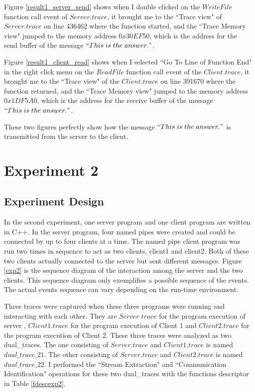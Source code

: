 Figure \ref{result1_server_send} shows when I double clicked on the $WriteFile$ function call event of $Server.trace$, it brought me to the ``Trace view" of $Server.trace$ on line 436462 where the function started, and the ``Trace Memory view" jumped to the memory address $0x30EF50$, which is the address for the send buffer of the message $``This\; is\; the\; answer."$.

Figure \ref{result1_client_read} shows when I selected ``Go To Line of Function End" in the right click menu on the $ReadFile$ function call event of the $Client.trace$, it brought me to the ``Trace view" of the $Client.trace$ on line 391670 where the function returned, and the ``Trace Memory view" jumped to the memory address $0x1DF5A0$, which is the address for the receive buffer of the message $``This\; is\; the\; answer."$.

These two figures perfectly show how the message $``This\; is\; the\; answer."$ is transmitted from the server to the client.

\section{Experiment 2}
\subsection{Experiment Design}
In the second experiment, one server program and one client program are written in C++. In the server program, four named pipes were created and could be connected by up to four clients at a time. The named pipe client program was run two times in sequence to act as two clients, client1 and client2. Both of these two clients actually connected to the server but sent different messages. Figure \ref{exp2} is the sequence diagram of the interaction among the server and the two clients. This sequence diagram only exemplifies a possible sequence of the events. The actual events sequence can vary depending on the run-time environment. 

Three traces were captured when these three programs were running and interacting with each other. They are $Server.trace$ for the program execution of server , $Client1.trace$ for the program execution of Client 1 and $Client2.trace$ for the program execution of Client 2. These three traces were analyzed as two dual\_traces. The one consisting of $Server.trace$ and $Client1.trace$ is named $dual\_trace\_21$. The other consisting of $Server.trace$ and $Client2.trace$ is named $dual\_trace\_22$. I performed the ``Stream Extraction" and ``Communication Identification" operations for these two dual\_traces with the functions descriptor in Table \ref{fdescexp2}.

